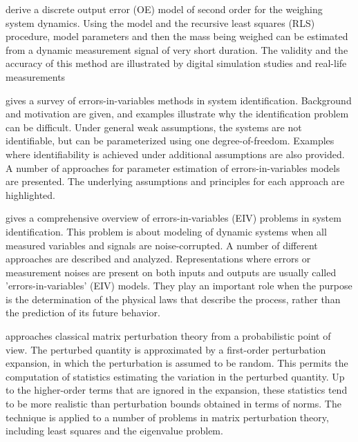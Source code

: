 \documentclass[11pt]{article}
\begin{document}
\citet{Shu93} derive a discrete output error (OE) model of second order for the weighing system dynamics. Using the model and the recursive least squares (RLS) procedure, model parameters and then the mass being weighed can be estimated from a dynamic measurement signal of very short duration. The validity and the accuracy of this method are illustrated by digital simulation studies and real-life measurements

\citet{Soderstrom07} gives a survey of errors-in-variables methods in system identification. Background and motivation are given, and examples illustrate why the identification problem can be difficult. Under general weak assumptions, the systems are not identifiable, but can be parameterized using one degree-of-freedom. Examples where identifiability is achieved under additional assumptions are also provided. A number of approaches for parameter estimation of errors-in-variables models are presented. The underlying assumptions and principles for each approach are highlighted.

\citet{Soderstrom18} gives a comprehensive overview of errors-in-variables (EIV) problems in system identification. This problem is about modeling of dynamic systems when all measured variables and signals are noise-corrupted. A number of different approaches are described and analyzed. Representations where errors or measurement noises are present on both inputs and outputs are usually called 'errors-in-variables' (EIV) models. They play an important role when the purpose is the determination of the physical laws that describe the process, rather than the prediction of its future behavior.

\citet{Stewart90SPT} approaches  classical matrix perturbation theory from a probabilistic point of view. The perturbed quantity is approximated by a first-order perturbation expansion, in which the perturbation is assumed to be random. This permits the computation of statistics estimating the variation in the perturbed quantity. Up to the higher-order terms that are ignored in the expansion, these statistics tend to be more realistic than perturbation bounds obtained in terms of norms. The technique is applied to a number of problems in matrix perturbation theory, including least squares and the eigenvalue problem.
\end{document}
